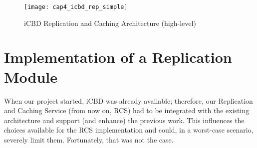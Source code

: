 

\begin{figure}[htbp]
    \centering
    \texttt{[image: cap4\_icbd\_rep\_simple]}
    \caption{iCBD Replication and Caching Architecture (high-level)}
    \label{fig:impl_icbd_rep_arch_simple}
\end{figure}

\section{Implementation of a Replication Module}
\label{sec:impl_icbdrep}



When our project started, iCBD was already available; therefore, our Replication and Caching Service (from now on, RCS) had to be integrated with the existing architecture and support (and enhance) the previous work. This influences the choices available for the RCS implementation and could, in a worst-case scenario, severely limit them. Fortunately, that was not the case.

